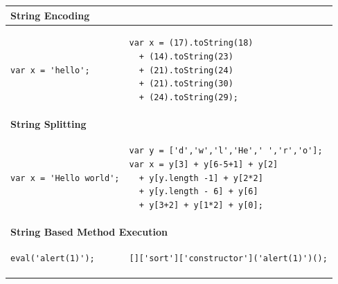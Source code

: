 			
			\begin{table}
				\begin{tabular}{|p{0.473\textwidth}|p{}|} \hline
					\multicolumn{2}{|l|}{\textbf{String Encoding}} \\ \hline
					\begin{lstlisting}
var x = 'hello';
					\end{lstlisting} &
					\begin{lstlisting}
var x = (17).toString(18) 
  + (14).toString(23) 
  + (21).toString(24) 
  + (21).toString(30) 
  + (24).toString(29);	
					\end{lstlisting} \\ \hline
					\multicolumn{2}{|l|}{\textbf{String Splitting}} \\ \hline
					\begin{lstlisting}
var x = 'Hello world';
					\end{lstlisting} &
					\begin{lstlisting}
var y = ['d','w','l','He',' ','r','o'];
var x = y[3] + y[6-5+1] + y[2] 
  + y[y.length -1] + y[2*2]
  + y[y.length - 6] + y[6]
  + y[3+2] + y[1*2] + y[0];
					\end{lstlisting} \\ \hline
					\multicolumn{2}{|l|}{\textbf{String Based Method Execution}} \\ \hline
					\begin{lstlisting}
eval('alert(1)');
					\end{lstlisting} &
					\begin{lstlisting}
[]['sort']['constructor']('alert(1)')();
					\end{lstlisting} \\ \hline
				\end{tabular}
			\end{table}
			
			
			
			
